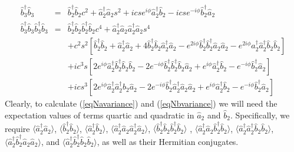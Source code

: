\documentclass[12pt]{iopart}
\begin{document}
\begin{eqnarray}
\hat{b}^{\dagger}_3 \hat{b}_3 &=& \hat{b}^{\dagger}_2 \hat{b}_2 c^2 +  \hat{a}^{\dagger}_2 \hat{a}_2 s^2 + i c s e^{i \phi} \hat{a}^{\dagger}_2 \hat{b}_2 - i c s e^{-i \phi} \hat{b}^{\dagger}_2 \hat{a}_2 \\
%
%
\hat{b}^{\dagger}_3 \hat{b}_3 \hat{b}^{\dagger}_3 \hat{b}_3 &=& \hat{b}^{\dagger}_2 \hat{b}_2 \hat{b}^{\dagger}_2 \hat{b}_2 c^4 + \hat{a}^{\dagger}_2 \hat{a}_2 \hat{a}^{\dagger}_2 \hat{a}_2 s^4 \nonumber \\
%
&& + c^2 s^2 [ \hat{b}^{\dagger}_2 \hat{b}_2 + \hat{a}^{\dagger}_2 \hat{a}_2 + 4 \hat{b}^{\dagger}_2 \hat{b}_2 \hat{a}^{\dagger}_2 \hat{a}_2 - e^{2 i \phi} \hat{b}^{\dagger}_2 \hat{b}^{\dagger}_2 \hat{a}_2 \hat{a}_2 -e^{2 i \phi} \hat{a}^{\dagger}_2 \hat{a}^{\dagger}_2 \hat{b}_2 \hat{b}_2 ] \nonumber \\
%
&& + i c^3 s [2 e^{i \phi} \hat{a}^{\dagger}_2 \hat{b}^{\dagger}_2 \hat{b}_2 \hat{b}_2 - 2 e^{-i \phi} \hat{b}^{\dagger}_2 \hat{b}^{\dagger}_2 \hat{b}_2 \hat{a}_2 + e^{i \phi} \hat{a}^{\dagger}_2 \hat{b}_2 - e^{-i \phi} \hat{b}^{\dagger}_2 \hat{a}_2 ] \nonumber \\
%
&& + i c s^3 [2 e^{i \phi} \hat{a}^{\dagger}_2 \hat{a}^{\dagger}_2 \hat{b}_2 \hat{a}_2 - 2 e^{-i \phi} \hat{b}^{\dagger}_2 \hat{a}^{\dagger}_2 \hat{a}_2 \hat{a}_2 + e^{i \phi} \hat{a}^{\dagger}_2 \hat{b}_2 - e^{-i \phi} \hat{b}^{\dagger}_2 \hat{a}_2 ] 
\end{eqnarray}
Clearly, to calculate (\ref{eqNavariance}) and (\ref{eqNbvariance}) we will need the expectation values of terms quartic and quadratic in $\hat{a}_2$ and ${\hat{b}_2}$. Specifically, we require $\langle \hat{a}^{\dagger}_2 \hat{a}_2 \rangle$, $\langle \hat{b}^{\dagger}_2 \hat{b}_2 \rangle$,  $\langle \hat{a}^{\dagger}_2 \hat{b}_2 \rangle$, $\langle \hat{a}^{\dagger}_2 \hat{a}_2 \hat{a}^{\dagger}_2 \hat{a}_2 \rangle$, $\langle \hat{b}^{\dagger}_2 \hat{b}_2 \hat{b}^{\dagger}_2 \hat{b}_2 \rangle$ , $\langle \hat{a}^{\dagger}_2 \hat{a}_2 \hat{b}^{\dagger}_2 \hat{b}_2 \rangle$, $\langle \hat{a}^{\dagger}_2 \hat{a}^{\dagger}_2 \hat{b}_2 \hat{b}_2 \rangle$, $\langle \hat{a}^{\dagger}_2 \hat{b}^{\dagger}_2 \hat{a}_2 \hat{a}_2 \rangle$, and $\langle \hat{a}^{\dagger}_2 \hat{b}^{\dagger}_2 \hat{b}_2 \hat{b}_2 \rangle$, as well as their Hermitian conjugates.
\end{document}
